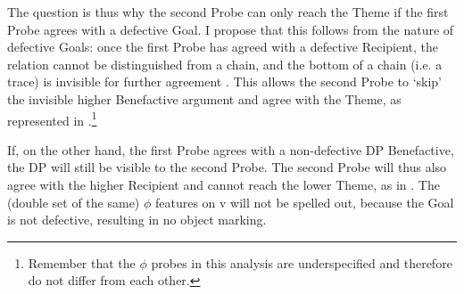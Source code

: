 \documentclass[output=paper
,modfonts
,nonflat]{langsci/langscibook}
\begin{document}
The question is thus why the second Probe can only reach the Theme if the first Probe agrees with a defective Goal. I propose that this follows from the nature of defective Goals: once the first Probe has agreed with a defective Recipient, the relation cannot be distinguished from a chain, and the bottom of a chain (i.e. a trace) is invisible for further agreement \citep{Chomsky2000, Chomsky2001}. This allows the second Probe to ‘skip’ the invisible higher Benefactive argument and agree with the Theme, as represented in .\footnote{Remember that the $\phi$ probes in this analysis are underspecified and therefore do not differ from each other.} 

If, on the other hand, the first Probe agrees with a non-defective DP Benefactive, the DP will still be visible to the second Probe. The second Probe will thus also agree with the higher Recipient and cannot reach the lower Theme, as in . The (double set of the same) $\phi$ features on v will not be spelled out, because the Goal is not defective, resulting in no object marking.
\end{document}
